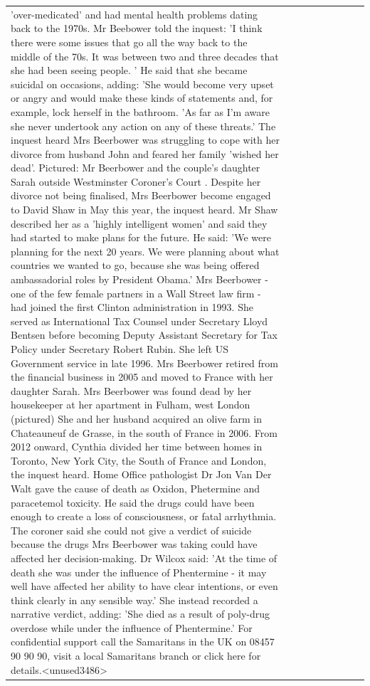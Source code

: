 \begin{table}[H]
\begin{tabular}{lllrlllll}
'over-medicated' and had mental health problems dating back to the 1970s. Mr Beebower told the inquest: 'I think there were some issues that go all the way back to the middle of the 70s. It was between two and three decades that she had been seeing people. ' He said that she became suicidal on occasions, adding: 'She would become very upset or angry and would make these kinds of statements and, for example, lock herself in the bathroom. 'As far as I'm aware she never undertook any action on any of these threats.' The inquest heard Mrs Beerbower was struggling to cope with her divorce from husband John and feared her family 'wished her dead'. Pictured: Mr Beerbower and the couple's daughter Sarah outside Westminster Coroner's Court . Despite her divorce not being finalised, Mrs Beerbower become engaged to David Shaw in May this year, the inquest heard. Mr Shaw described her as a 'highly intelligent women' and said they had started to make plans for the future. He said: 'We were planning for the next 20 years. We were planning about what countries we wanted to go, because she was being offered ambassadorial roles by President Obama.' Mrs Beerbower - one of the few female partners in a Wall Street law firm - had joined the first Clinton administration in 1993. She served as International Tax Counsel under Secretary Lloyd Bentsen before becoming Deputy Assistant Secretary for Tax Policy under Secretary Robert Rubin. She left US Government service in late 1996. Mrs Beerbower retired from the financial business in 2005 and moved to France with her daughter Sarah. Mrs Beerbower was found dead by her housekeeper at her apartment in Fulham, west London (pictured) She and her husband acquired an olive farm in Chateauneuf de Grasse, in the south of France in 2006. From 2012 onward, Cynthia divided her time between homes in Toronto, New York City, the South of France and London, the inquest heard. Home Office pathologist Dr Jon Van Der Walt gave the cause of death as Oxidon, Phetermine and paracetemol toxicity. He said the drugs could have been enough to create a loss of consciousness, or fatal arrhythmia. The coroner said she could not give a verdict of suicide because the drugs Mrs Beerbower was taking could have affected her decision-making. Dr Wilcox said: 'At the time of death she was under the influence of Phentermine - it may well have affected her ability to have clear intentions, or even think clearly in any sensible way.' She instead recorded a narrative verdict, adding: 'She died as a result of poly-drug overdose while under the influence of Phentermine.' For confidential support call the Samaritans in the UK on 08457 90 90 90, visit a local Samaritans branch or click here for details.<unused3486> \\

\end{tabular}
\end{table}
